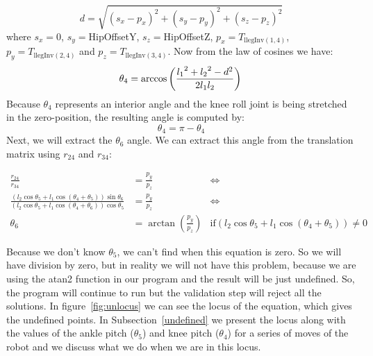 \[
d = \sqrt{\left(s_x-p_x\right)^2 + \left(s_y-p_y\right)^2 + \left(s_z-p_z\right)^2}
\]
where $s_x = 0$, $s_y = $HipOffsetY, $s_z =$HipOffsetZ, $p_x = T_{\text{llegInv}(1,4)}$, $p_y = T_{\text{llegInv}(2,4)}$ and $p_z = T_{\text{llegInv}(3,4)}$.
Now from the law of cosines we have:
\[
\theta_4 =\arccos\left(\frac{{l_1}^2 + {l_2}^2 - d^2}{2 l_1 l_2}\right)\\
\]
Because $\theta_4$ represents an interior angle and the knee roll joint is being stretched in the zero-position, the resulting angle is computed by:
\[
\theta_4 = \pi - \theta_4
\]
Next, we will extract the $\theta_6$ angle. We can extract this angle from the translation matrix using $r_{24}$ and $r_{34}$:
\begin{small}
\begin{align*}
\frac{r_{24}}{r_{34}} &= \frac{p_y}{p_z} &\Leftrightarrow \\
\frac{\left(l_2\cos\theta_5 + l_1 \cos\left(\theta_4 + \theta_5\right)\right)\sin\theta_6}{\left(l_2\cos\theta_5 + l_1 \cos\left(\theta_4 + \theta_6\right)\right) \cos\theta_5} &= \frac{p_y}{p_z} &\Leftrightarrow \\
\theta_6 &= \arctan\left(\frac{p_y}{p_z}\right)&\text{if} \left(l_2\cos\theta_5 + l_1 \cos\left(\theta_4 + \theta_5\right)\right) \neq 0
\end{align*}
\end{small}
Because we don't know $\theta_5$, we can't find when this equation is zero. So we will have division by zero, but in reality we will not have this problem, because we are using the atan2 function in our program and the result will be just undefined. So, the program will continue to run but the validation step will reject all the solutions. In figure~\ref{fig:unlocus} we can see the locus of the equation, which gives the undefined points. In Subsection~\ref{undefined} we present the locus along with the values of the ankle pitch ($\theta_5$) and knee pitch ($\theta_4$) for a series of moves of the robot and we discuss what we do when we are in this locus.

